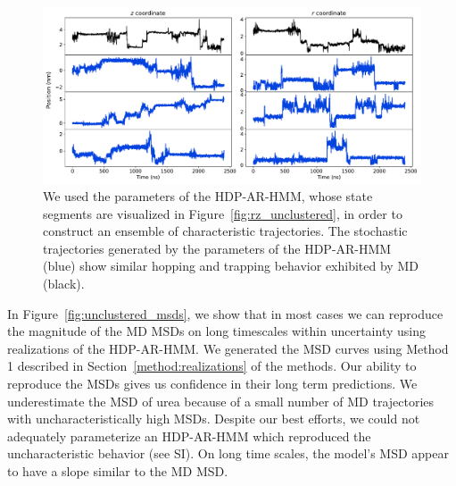 \documentclass[journal=jpcbfk,manuscript=article]{achemso}
\begin{document}
  \begin{figure}
  \centering
  \includegraphics[width=\textwidth]{qualitative_unclustered_MET2.pdf}
  \caption{We used the parameters of the HDP-AR-HMM, whose state segments are 
  visualized in Figure~\ref{fig:rz_unclustered}, in order to construct an 
  ensemble of characteristic trajectories. The stochastic trajectories 
  generated by the parameters of the HDP-AR-HMM (blue) show 
  similar hopping
  and trapping behavior exhibited by MD (black).
  }\label{fig:qualitative_unclustered}
  \end{figure}
  
  In Figure~\ref{fig:unclustered_msds}, we show that in most cases we can 
  reproduce the magnitude of the MD MSDs on long timescales within uncertainty
  using realizations of the HDP-AR-HMM. We generated the MSD curves using Method
  1 described in Section~\ref{method:realizations} of the methods. Our ability
  to reproduce the MSDs gives us confidence in their long term predictions.
  We underestimate the MSD of urea because of a small number of MD trajectories
  with uncharacteristically high MSDs. Despite our best efforts, we could not 
  adequately parameterize an HDP-AR-HMM which reproduced the uncharacteristic
  behavior (see SI).  %
  On long time scales, the model's MSD appear to have a slope similar to the MD 
  MSD.
  
\end{document}
